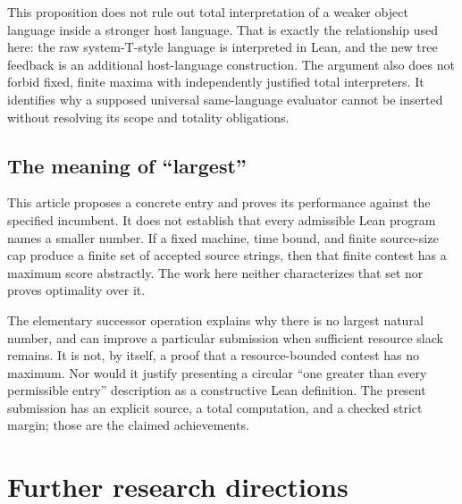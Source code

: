 \documentclass[11pt,letterpaper]{article}
\theoremstyle{definition}
\begin{document}
This proposition does not rule out total interpretation of a weaker object
language inside a stronger host language. That is exactly the relationship
used here: the raw system-T-style language is interpreted in Lean, and the
new tree feedback is an additional host-language construction. The argument
also does not forbid fixed, finite maxima with independently justified total
interpreters. It identifies why a supposed universal same-language evaluator
cannot be inserted without resolving its scope and totality obligations.

\subsection{The meaning of ``largest''}

This article proposes a concrete entry and proves its performance against the
specified incumbent. It does not establish that every admissible Lean program
names a smaller number. If a fixed machine, time bound, and finite source-size
cap produce a finite set of accepted source strings, then that finite contest
has a maximum score abstractly. The work here neither characterizes that set
nor proves optimality over it.

The elementary successor operation explains why there is no largest natural
number, and can improve a particular submission when sufficient resource
slack remains. It is not, by itself, a proof that a resource-bounded contest
has no maximum. Nor would it justify presenting a circular ``one greater than
every permissible entry'' description as a constructive Lean definition.
The present submission has an explicit source, a total computation, and a
checked strict margin; those are the claimed achievements.

\section{Further research directions}
\end{document}
